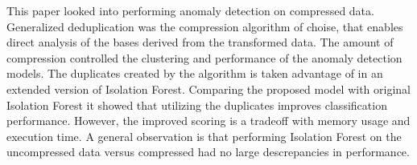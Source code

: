 This paper looked into performing anomaly detection on compressed data. Generalized deduplication was the compression algorithm of choise, that enables direct analysis of the bases derived from the transformed data. The amount of compression controlled the clustering and performance of the anomaly detection models. The duplicates created by the algorithm is taken advantage of in an extended version of Isolation Forest. Comparing the proposed model with original Isolation Forest it showed that utilizing the duplicates improves classification performance. However, the improved scoring is a tradeoff with memory usage and execution time. A general observation is that performing Isolation Forest on the uncompressed data versus compressed had no large descrepancies in performance.    